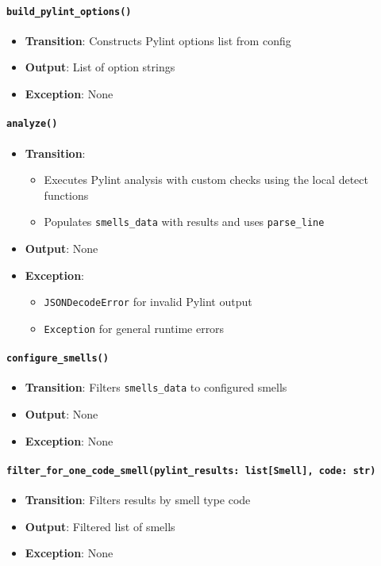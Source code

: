 \documentclass[12pt, titlepage]{article}
\begin{document}
\paragraph{\texttt{build\_pylint\_options()}}
\begin{itemize}
\item \textbf{Transition}: Constructs Pylint options list from config
\item \textbf{Output}: List of option strings
\item \textbf{Exception}: None
\end{itemize}

\paragraph{\texttt{analyze()}}
\begin{itemize}
\item \textbf{Transition}:
\begin{itemize}
\item Executes Pylint analysis with custom checks using the local detect functions
\item Populates \texttt{smells\_data} with results and uses \texttt{parse\_line}
\end{itemize}
\item \textbf{Output}: None
\item \textbf{Exception}:
\begin{itemize}
\item \texttt{JSONDecodeError} for invalid Pylint output
\item \texttt{Exception} for general runtime errors
\end{itemize}
\end{itemize}

\paragraph{\texttt{configure\_smells()}}
\begin{itemize}
\item \textbf{Transition}: Filters \texttt{smells\_data} to configured smells
\item \textbf{Output}: None
\item \textbf{Exception}: None
\end{itemize}

\paragraph{\texttt{filter\_for\_one\_code\_smell(pylint\_results: list[Smell], code: str)}}
\begin{itemize}
\item \textbf{Transition}: Filters results by smell type code
\item \textbf{Output}: Filtered list of smells
\item \textbf{Exception}: None
\end{itemize}
\end{document}
